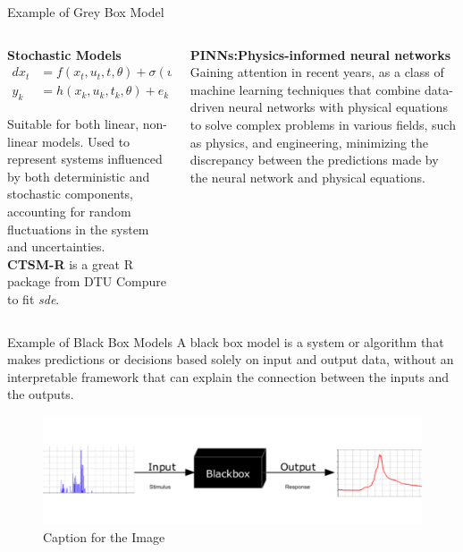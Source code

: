 \documentclass[aspectratio=169,hyperref={pdfpagelabels=false}]{beamer}
\begin{document}
\begin{frame}{Example of Grey Box Model}
  \begin{columns}
    \begin{column}{0.5\textwidth}
      \begin{tcolorbox}[width=1\linewidth, height = 1.1\linewidth]
      \textbf{Stochastic Models}
      \begin{align*}
        dx_t &= f(x_t, u_t, t, \theta) + \sigma(u_t, t, \theta)d\omega \\
        y_k  &= h(x_k, u_k, t_k, \theta) + e_k
      \end{align*}
    
      Suitable for both linear, non-linear models.  
      Used to represent systems influenced by both deterministic and stochastic components,
      accounting for random fluctuations in the system and uncertainties. \\
      \textbf{CTSM-R} is a great R package from DTU Compure to fit \textit{sde}.
      \end{tcolorbox}\pause 

    \end{column}
    \begin{column}{0.5\textwidth}
      \begin{tcolorbox}[width=1\linewidth, height = 1.1\linewidth]
        \textbf{PINNs:Physics-informed neural networks} \\
        Gaining attention in recent years, as a class of machine learning techniques that combine data-driven neural
        networks with physical equations to solve complex problems in various fields,
        such as physics, and engineering, minimizing the discrepancy between the predictions made by the neural network and physical equations.
        \end{tcolorbox}
    \end{column}
\end{columns} 



\end{frame}

\begin{frame}{Example of Black Box Models}
  A black box model is a system or algorithm that makes predictions or decisions based solely on input and output data,
  without an interpretable framework that can explain the connection between the inputs and the outputs.
  \begin{figure}
    \centering
    \includegraphics[scale=0.5]{img/pic10.png}
    \caption{Caption for the Image}
    \label{fig:example}
  \end{figure}

\end{frame}
\end{document}
